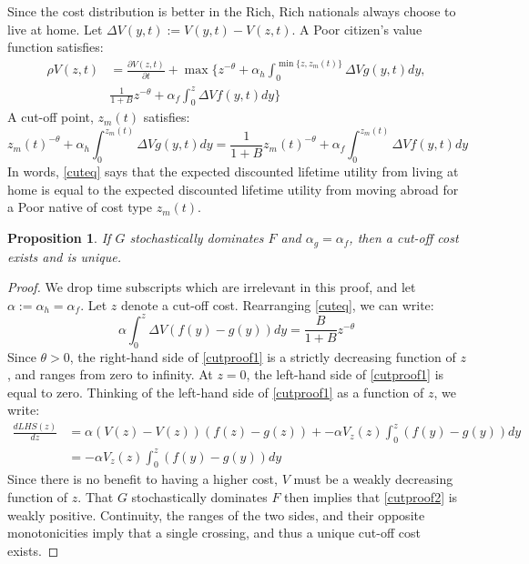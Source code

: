 \documentclass[12pt]{article}
\newtheorem{proposition}[theorem]{Proposition}
\begin{document}
Since the cost distribution is better in the Rich, Rich nationals always choose to live at home.
Let $\Delta V(y,t) := V(y,t)-V(z,t)$.
A Poor citizen's value function satisfies:
\begin{align}
  \label{valfun}
  \rho V(z,t) &= \frac{\partial V(z,t)}{\partial t} + \max\Bigg\{z^{-\theta} +  \alpha_h \int_0^{\min \{z,z_m(t)\}} \Delta V g(y,t) dy, \nonumber  \\
  & \frac{1}{1+B} z^{-\theta}+ \alpha_f \int_0^z \Delta V f(y,t) dy \Bigg\}
\end{align}
A cut-off point, $z_m(t)$ satisfies:
\begin{equation}
  \label{cuteq}
  z_m(t)^{-\theta} + \alpha_h \int_0^{z_m(t)} \Delta V g(y,t) dy = \frac{1}{1+B} z_m(t)^{-\theta} + \alpha_f \int_0^{z_m(t)} \Delta V f(y,t)dy
\end{equation}
In words, \eqref{cuteq} says that the expected discounted lifetime utility from living at home is equal to the expected discounted lifetime utility from moving abroad for a Poor native of cost type $z_m(t)$.
\begin{proposition}
  \label{uniqcut}
 If $G$ stochastically dominates $F$ and $\alpha_g = \alpha_f$, then a cut-off cost exists and is unique. 
\end{proposition}
\begin{proof}
  We drop time subscripts which are irrelevant in this proof, and let $\alpha := \alpha_h = \alpha_f$.
  Let $z$ denote a cut-off cost.
  Rearranging \eqref{cuteq}, we can write:
  \begin{equation}
    \label{cutproof1}
    \alpha \int_0^{z} \Delta V \left(f(y)-g(y)\right)dy = \frac{B}{1+B}z^{-\theta}
  \end{equation}
  Since $\theta > 0$, the right-hand side of \eqref{cutproof1} is a strictly decreasing function of $z$, and ranges from zero to infinity.
  At $z=0$, the left-hand side of \eqref{cutproof1} is equal to zero.  Thinking of the left-hand side of \eqref{cutproof1} as a function of $z$, we write:
  \begin{align}
    \label{cutproof2}
    \frac{d LHS(z)}{d z} &= \alpha \left(V(z)-V(z)\right)\left(f(z)-g(z)\right) + - \alpha V_z(z) \int_0^z \left(f(y)-g(y)\right) dy \nonumber \\
    &= - \alpha V_z(z) \int_0^z \left(f(y)-g(y)\right) dy
  \end{align}
  Since there is no benefit to having a higher cost, $V$ must be a weakly decreasing function of $z$.  That $G$ stochastically dominates $F$ then implies that \eqref{cutproof2} is weakly positive.  Continuity, the ranges of the two sides, and their opposite monotonicities imply that a single crossing, and thus a unique cut-off cost exists.
\end{proof}
\end{document}

